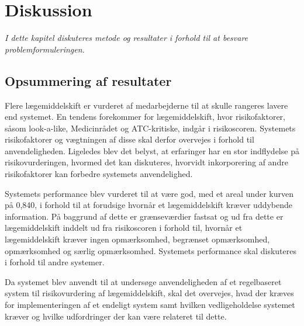 
\chapter{Diskussion}
\textit{I dette kapitel diskuteres metode og resultater i forhold til at besvare problemformuleringen.}


\section{Opsummering af resultater}
Flere lægemiddelskift er vurderet af medarbejderne til at skulle rangeres lavere end systemet. En tendens forekommer for lægemiddelskift, hvor risikofaktorer, såsom look-a-like, Medicinrådet og ATC-kritiske, indgår i risikoscoren. Systemets risikofaktorer og vægtningen af disse skal derfor overvejes i forhold til anvendeligheden. Ligeledes blev det belyst, at erfaringer har en stor indflydelse på risikovurderingen, hvormed det kan diskuteres, hvorvidt inkorporering af andre risikofaktorer kan forbedre systemets anvendelighed.

Systemets performance blev vurderet til at være god, med et areal under kurven på 0,840, i forhold til at forudsige hvornår et lægemiddelskift kræver uddybende information. På baggrund af dette er grænseværdier fastsat og ud fra dette er lægemiddelskift inddelt ud fra risikoscoren i forhold til, hvornår et lægemiddelskift kræver ingen opmærksomhed, begrænset opmærksomhed, opmærksomhed og særlig opmærksomhed. Systemets performance skal diskuteres i forhold til andre systemer. 

Da systemet blev anvendt til at undersøge anvendeligheden af et regelbaseret system til risikovurdering af lægemiddelskift, skal det overvejes, hvad der kræves for implementeringen af et endeligt system samt hvilken vedligeholdelse systemet kræver og hvilke udfordringer der kan være relateret til dette. 

